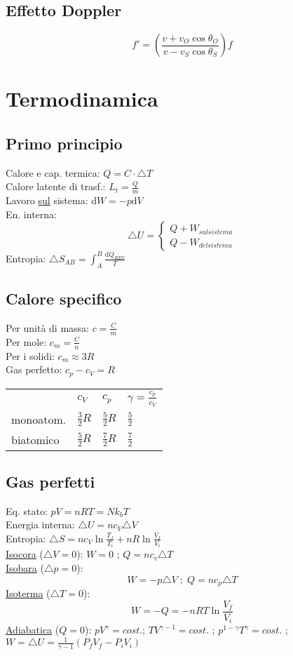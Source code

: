 \documentclass{article}
\begin{document}
\begin{small}
\begin{multicols}{3}
	\subsection{Effetto Doppler}
		\[ f' = \left ( \frac{ v + v_O \cos \theta_O }{ v - v_S \cos \theta_S } \right ) f \]
\section{Termodinamica}
	\subsection{Primo principio}
		Calore e cap. termica: $ Q = C \cdot \triangle T $ \\
		Calore latente di trasf.: $ L_t = \frac{ Q }{ m } $ \\
		Lavoro \underline{sul} sistema: $ \mathrm d W = - p \mathrm d V $ \\
		En. interna: \[ \triangle U = \begin{cases} Q + W_{sul sistema} \\ Q - W_{del sistema} \end{cases} \]
		Entropia: $ \triangle S_{AB} = \int_{A}^{B} \frac{ \mathrm d Q_{REV} }{ T } $
	\subsection{Calore specifico}
		Per unità di massa: $ c = \frac{ C }{ m } $ \\
		Per mole: $ c_m = \frac{ C }{ n } $ \\
		Per i solidi: $ c_m \approx 3 R $ \\
		Gas perfetto: $ c_p - c_V = R $ \\
		\begin{tabular}{l|lll}
			          & $c_V$             & $c_p$             & $\gamma = \frac{ c_p }{ c_V }$ \\
			monoatom. & $\frac{ 3 }{2} R$ & $\frac{ 5 }{2} R$ & $\frac{ 5 }{2}$ \\
			biatomico & $\frac{ 5 }{2} R$ & $\frac{ 7 }{2} R$ & $\frac{ 7 }{2}$
		\end{tabular}
	\subsection{Gas perfetti}
		Eq. stato: $ p V = n R T = N k_b T $ \\
		Energia interna: $ \triangle U = n c_V \triangle V $ \\
		Entropia: $ \triangle S = n c_V \ln \frac{ T_f }{ T_i } + n R \ln \frac{ V_f }{ V_i } $ \\
		\underline{Isocora} ($ \triangle V = 0 $): $ W = 0 $ ; $ Q = n c_v \triangle T $ \\
		\underline{Isobara} ($ \triangle p = 0 $): \[ W = - p \triangle V \;;\; Q = n c_p \triangle T \]
		\underline{Isoterma} ($ \triangle T = 0 $): \[ W = - Q = - n R T \ln \frac{ V_f }{ V_i } \]
		\underline{Adiabatica} ($ Q = 0 $): $ p V^{\gamma} = cost. $; $ T V^{\gamma -1} = cost.$ ; $ p^{1 - \gamma} T^{\gamma} = cost.$ ;
					$ W = \triangle U = \frac{1}{ \gamma -1 } ( P_f V_f - P_i V_i ) $ 

\end{multicols}
\end{small}
\end{document}
